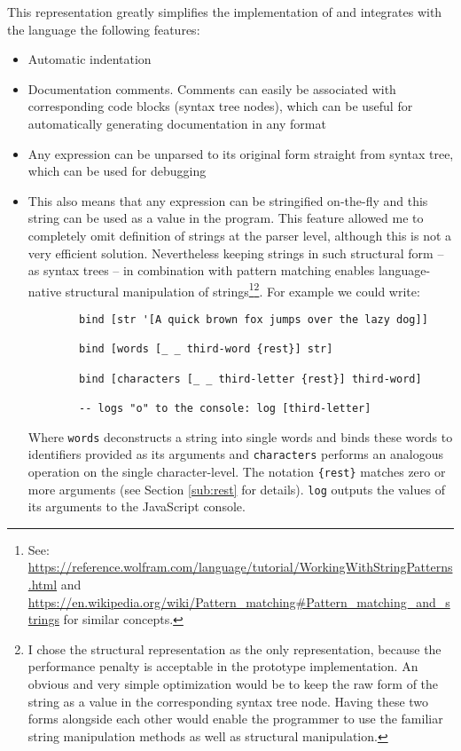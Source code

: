 This representation greatly simplifies the implementation of and integrates with
the language the following features:
\begin{itemize}
    \item Automatic indentation
    \item Documentation comments. Comments can easily be associated with
      corresponding code blocks (syntax tree nodes), which can be useful for
      automatically generating documentation in any format
    \item Any expression can be unparsed to its original form straight from
      syntax tree, which can be used for debugging
    \item This also means that any expression can be stringified on-the-fly and
      this string can be used as a value in the program. This feature allowed me
      to completely omit definition of strings at the parser level, although
      this is not a very efficient solution. Nevertheless keeping strings in
      such structural form -- as syntax trees -- in combination with pattern
      matching enables language-native structural manipulation of
      strings\footnote{See:
        \url{https://reference.wolfram.com/language/tutorial/WorkingWithStringPatterns.html}
        and
        \url{https://en.wikipedia.org/wiki/Pattern_matching\#Pattern_matching_and_strings}
        for similar concepts.}\footnote{I chose the structural representation as
        the only representation, because the performance penalty is acceptable
        in the prototype implementation. An obvious and very simple optimization
        would be to keep the raw form of the string as a value in the
        corresponding syntax tree node. Having these two forms alongside each
        other would enable the programmer to use the familiar string
        manipulation methods as well as structural manipulation.}. For example
      we could write:
    \begin{lstlisting}
        bind [str '[A quick brown fox jumps over the lazy dog]]
                    
        bind [words [_ _ third-word {rest}] str]
        
        bind [characters [_ _ third-letter {rest}] third-word]
        
        -- logs "o" to the console: log [third-letter]
    \end{lstlisting}
    
Where \texttt{words} deconstructs a string into single words and binds these
words to identifiers provided as its arguments and \texttt{characters} performs
an analogous operation on the single character-level. The notation
\texttt{\{rest\}} matches zero or more arguments (see Section \ref{sub:rest} for
details). \texttt{log} outputs the values of its arguments to the JavaScript
console.
\end{itemize}


